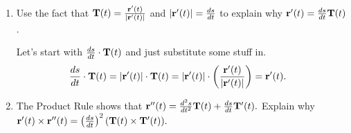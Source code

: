 \begin{enumerate}[leftmargin=0pt]
{\begin{enumerate}
        \begin{red}
            Let's start by remembering what $s(t)$ is: it's the function that tells us how far we've gone by time $t$, so it's the accumulation function of the speed of the particle:
            \begin{align*}
                 s(t) &= \int_0^t |\vr'(u)|\ du
                 \intertext{Therefore,}
                 \frac{ds}{dt} &= \frac{d}{dt} \left[ \int_0^t |\vr'(u)|\ du\right] = |\vr'(t)|,
            \end{align*}
            by the fundamental theorem of calculus.
        \end{red}
        
        \item Use the fact that $\mathbf{T}(t) = \frac{\mathbf{r}'(t)}{\lvert \mathbf{r}'(t) \rvert}$ and $\lvert \mathbf{r}'(t) \rvert = \frac{ds}{dt}$ to explain why $\mathbf{r}'(t) = \frac{ds}{dt} \mathbf{T}(t)$.
        
        \begin{red}
        Let's start with $\frac{ds}{dt}\cdot \mathbf{T}(t)$ and just substitute some stuff in.
            \begin{align*}
                \frac{ds}{dt}\cdot \mathbf{T}(t) &= 
                |\mathbf{r}'(t)|\cdot \mathbf{T}(t) =
                |\mathbf{r}'(t)| \cdot \left(\frac{\mathbf{r}'(t)}{\lvert \mathbf{r}'(t) \rvert}\right) = \mathbf{r}'(t).
            \end{align*}
        \end{red}
        
        \item The Product Rule shows that $\mathbf{r}''(t) = \frac{d^2s}{dt^2} \mathbf{T}(t) + \frac{ds}{dt} \mathbf{T}'(t).$ Explain why $\mathbf{r}'(t) \times \mathbf{r}''(t) = \left(\frac{ds}{dt}\right)^2 (\mathbf{T}(t) \times \mathbf{T}'(t)).$
        

\end{enumerate}}
\end{enumerate}
